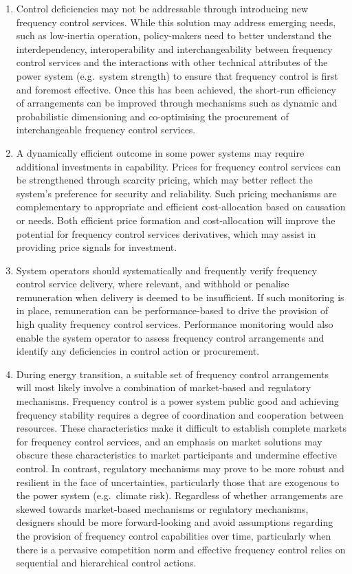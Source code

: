 \documentclass[12pt,a4paper,]{report}
\begin{document}
\begin{enumerate}
\def\labelenumi{\arabic{enumi}.}
\item
  Control deficiencies may not be addressable through introducing new
  frequency control services. While this solution may address emerging
  needs, such as low-inertia operation, policy-makers need to better
  understand the interdependency, interoperability and
  interchangeability between frequency control services and the
  interactions with other technical attributes of the power system
  (e.g.~system strength) to ensure that frequency control is first and
  foremost effective. Once this has been achieved, the short-run
  efficiency of arrangements can be improved through mechanisms such as
  dynamic and probabilistic dimensioning and co-optimising the
  procurement of interchangeable frequency control services.
\item
  A dynamically efficient outcome in some power systems may require
  additional investments in capability. Prices for frequency control
  services can be strengthened through scarcity pricing, which may
  better reflect the system's preference for security and reliability.
  Such pricing mechanisms are complementary to appropriate and efficient
  cost-allocation based on causation or needs. Both efficient price
  formation and cost-allocation will improve the potential for frequency
  control services derivatives, which may assist in providing price
  signals for investment.
\item
  System operators should systematically and frequently verify frequency
  control service delivery, where relevant, and withhold or penalise
  remuneration when delivery is deemed to be insufficient. If such
  monitoring is in place, remuneration can be performance-based to drive
  the provision of high quality frequency control services. Performance
  monitoring would also enable the system operator to assess frequency
  control arrangements and identify any deficiencies in control action
  or procurement.
\item
  During energy transition, a suitable set of frequency control
  arrangements will most likely involve a combination of market-based
  and regulatory mechanisms. Frequency control is a power system public
  good and achieving frequency stability requires a degree of
  coordination and cooperation between resources. These characteristics
  make it difficult to establish complete markets for frequency control
  services, and an emphasis on market solutions may obscure these
  characteristics to market participants and undermine effective
  control. In contrast, regulatory mechanisms may prove to be more
  robust and resilient in the face of uncertainties, particularly those
  that are exogenous to the power system (e.g.~climate risk). Regardless
  of whether arrangements are skewed towards market-based mechanisms or
  regulatory mechanisms, designers should be more forward-looking and
  avoid assumptions regarding the provision of frequency control
  capabilities over time, particularly when there is a pervasive
  competition norm and effective frequency control relies on sequential
  and hierarchical control actions.
\end{enumerate}
\end{document}
